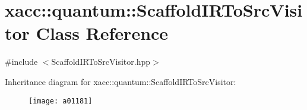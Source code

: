 \hypertarget{a01181}{}\section{xacc\+:\+:quantum\+:\+:Scaffold\+I\+R\+To\+Src\+Visitor Class Reference}
\label{a01181}


{\ttfamily \#include $<$Scaffold\+I\+R\+To\+Src\+Visitor.\+hpp$>$}

Inheritance diagram for xacc\+:\+:quantum\+:\+:Scaffold\+I\+R\+To\+Src\+Visitor\+:\begin{figure}[H]
\begin{center}
\leavevmode
\texttt{[image: a01181]}
\end{center}
\end{figure}
